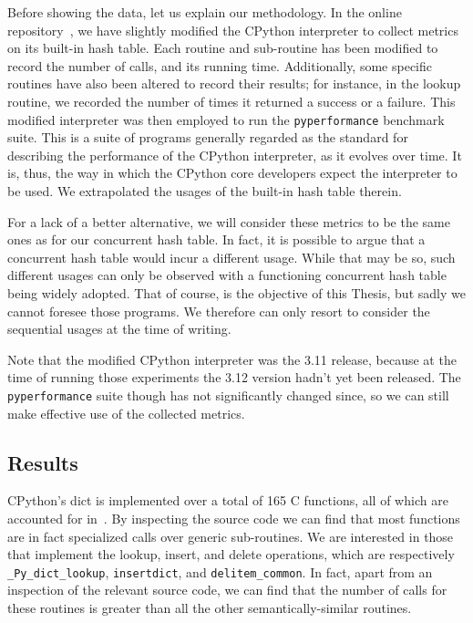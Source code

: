 Before showing the data, let us explain our methodology.
In the online repository~\cite{dict-metrics}, we have slightly modified the CPython interpreter to collect metrics on its built-in hash table.
Each routine and sub-routine has been modified to record the number of calls, and its running time.
Additionally, some specific routines have also been altered to record their results; for instance, in the lookup routine, we recorded the number of times it returned a success or a failure.
This modified interpreter was then employed to run the \texttt{pyperformance} benchmark suite.
This is a suite of programs generally regarded as the standard for describing the performance of the CPython interpreter, as it evolves over time.
It is, thus, the way in which the CPython core developers expect the interpreter to be used.
We extrapolated the usages of the built-in hash table therein.

For a lack of a better alternative, we will consider these metrics to be the same ones as for our concurrent hash table.
In fact, it is possible to argue that a concurrent hash table would incur a different usage.
While that may be so, such different usages can only be observed with a functioning concurrent hash table being widely adopted.
That of course, is the objective of this Thesis, but sadly we cannot foresee those programs.
We therefore can only resort to consider the sequential usages at the time of writing.

Note that the modified CPython interpreter was the 3.11 release, because at the time of running those experiments the 3.12 version hadn't yet been released.
The \texttt{pyperformance} suite though has not significantly changed since, so we can still make effective use of the collected metrics.

\subsection{Results}\label{subsec:dict-metrics-results}

CPython's dict is implemented over a total of 165 C functions, all of which are accounted for in~\cite{dict-metrics}.
By inspecting the source code we can find that most functions are in fact specialized calls over generic sub-routines.
We are interested in those that implement the lookup, insert, and delete operations, which are respectively \texttt{\_Py\_dict\_lookup}, \texttt{insertdict}, and \texttt{delitem\_common}.
In fact, apart from an inspection of the relevant source code, we can find that the number of calls for these routines is greater than all the other semantically-similar routines.

